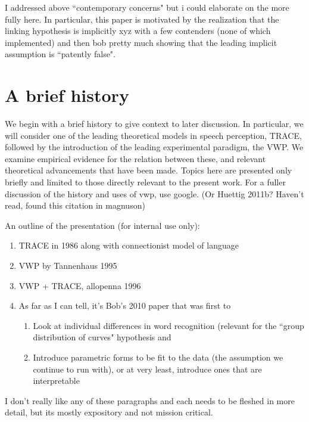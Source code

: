 \documentclass{article}
\begin{document}
I addressed above ``contemporary concerns" but i could elaborate on the more fully here. In particular, this paper is motivated by the realization that the linking hypothesis is implicitly xyz with a few contenders (none of which implemented) and then bob pretty much showing that the leading implicit assumption is ``patently false".


\section{A brief history}
We begin with a brief history to give context to later discussion. In particular, we will consider one of the leading theoretical models in speech perception, TRACE, followed by the introduction of the leading experimental paradigm, the VWP. We examine empirical evidence for the relation between these, and relevant theoretical advancements that have been made. Topics here are presented only briefly and limited to those directly relevant to the present work. For a fuller discussion of the history and uses of vwp, use google. (Or Huettig 2011b? Haven't read, found this citation in magnuson)

An outline of the presentation (for internal use only):

\begin{singlespace}
\begin{enumerate}
\vspace{-2mm}
\item TRACE in 1986 along with connectionist model of language
\item VWP by Tannenhaus 1995
\item VWP + TRACE, allopenna 1996
\item As far as I can tell, it's Bob's 2010 paper that was first to 
\begin{enumerate}
\item Look at individual differences in word recognition (relevant for the ``group distribution of curves" hypothesis and
\item Introduce parametric forms to be fit to the data (the assumption we continue to run with), or at very least, introduce ones that are interpretable
\end{enumerate}
\end{enumerate}
\end{singlespace}

I don't really like any of these paragraphs and each needs to be fleshed in more detail, but its mostly expository and not mission critical.
\end{document}
